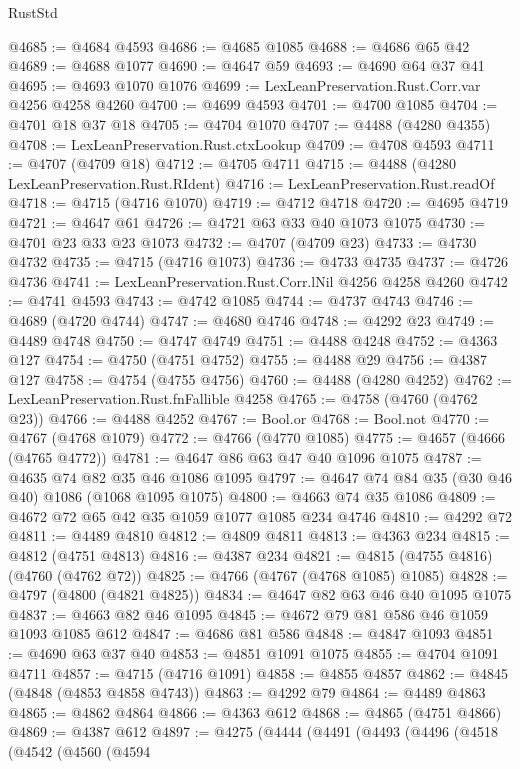 \begin{lexlean}{RustStd}
\begin{coremodule}
{\begin{coremodule}
{{{{{{{{{{{{{{{{{{{{{{{{{{{{{{{{{{{@4685 := @4684 @4593
@4686 := @4685 @1085
@4688 := @4686 @65 @42
@4689 := @4688 @1077
@4690 := @4647 @59
@4693 := @4690 @64 @37 @41
@4695 := @4693 @1070 @1076
@4699 := LexLeanPreservation.Rust.Corr.var @4256 @4258 @4260
@4700 := @4699 @4593
@4701 := @4700 @1085
@4704 := @4701 @18 @37 @18
@4705 := @4704 @1070
@4707 := @4488 (@4280 @4355)
@4708 := LexLeanPreservation.Rust.ctxLookup
@4709 := @4708 @4593
@4711 := @4707 (@4709 @18)
@4712 := @4705 @4711
@4715 := @4488 (@4280 LexLeanPreservation.Rust.RIdent)
@4716 := LexLeanPreservation.Rust.readOf
@4718 := @4715 (@4716 @1070)
@4719 := @4712 @4718
@4720 := @4695 @4719
@4721 := @4647 @61
@4726 := @4721 @63 @33 @40 @1073 @1075
@4730 := @4701 @23 @33 @23 @1073
@4732 := @4707 (@4709 @23)
@4733 := @4730 @4732
@4735 := @4715 (@4716 @1073)
@4736 := @4733 @4735
@4737 := @4726 @4736
@4741 := LexLeanPreservation.Rust.Corr.lNil @4256 @4258 @4260
@4742 := @4741 @4593
@4743 := @4742 @1085
@4744 := @4737 @4743
@4746 := @4689 (@4720 @4744)
@4747 := @4680 @4746
@4748 := @4292 @23
@4749 := @4489 @4748
@4750 := @4747 @4749
@4751 := @4488 @4248
@4752 := @4363 @127
@4754 := @4750 (@4751 @4752)
@4755 := @4488 @29
@4756 := @4387 @127
@4758 := @4754 (@4755 @4756)
@4760 := @4488 (@4280 @4252)
@4762 := LexLeanPreservation.Rust.fnFallible @4258
@4765 := @4758 (@4760 (@4762 @23))
@4766 := @4488 @4252
@4767 := Bool.or
@4768 := Bool.not
@4770 := @4767 (@4768 @1079)
@4772 := @4766 (@4770 @1085)
@4775 := @4657 (@4666 (@4765 @4772))
@4781 := @4647 @86 @63 @47 @40 @1096 @1075
@4787 := @4635 @74 @82 @35 @46 @1086 @1095
@4797 := @4647 @74 @84 @35 (@30 @46 @40) @1086 (@1068 @1095 @1075)
@4800 := @4663 @74 @35 @1086
@4809 := @4672 @72 @65 @42 @35 @1059 @1077 @1085 @234 @4746
@4810 := @4292 @72
@4811 := @4489 @4810
@4812 := @4809 @4811
@4813 := @4363 @234
@4815 := @4812 (@4751 @4813)
@4816 := @4387 @234
@4821 := @4815 (@4755 @4816) (@4760 (@4762 @72))
@4825 := @4766 (@4767 (@4768 @1085) @1085)
@4828 := @4797 (@4800 (@4821 @4825))
@4834 := @4647 @82 @63 @46 @40 @1095 @1075
@4837 := @4663 @82 @46 @1095
@4845 := @4672 @79 @81 @586 @46 @1059 @1093 @1085 @612
@4847 := @4686 @81 @586
@4848 := @4847 @1093
@4851 := @4690 @63 @37 @40
@4853 := @4851 @1091 @1075
@4855 := @4704 @1091 @4711
@4857 := @4715 (@4716 @1091)
@4858 := @4855 @4857
@4862 := @4845 (@4848 (@4853 @4858 @4743))
@4863 := @4292 @79
@4864 := @4489 @4863
@4865 := @4862 @4864
@4866 := @4363 @612
@4868 := @4865 (@4751 @4866)
@4869 := @4387 @612
@4897 := @4275
    (@4444
      (@4491
        (@4493
          (@4496
            (@4518
              (@4542
                (@4560
                  (@4594
}}}}}}}}}}}}}}}}}}}}}}}}}}}}}}}}}}}
\end{coremodule}}
\end{coremodule}
\end{lexlean}
